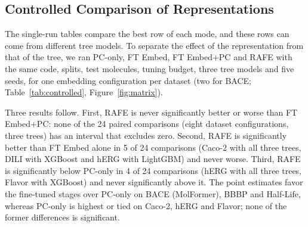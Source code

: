 \documentclass[pdflatex,sn-mathphys-num]{sn-jnl}%
\begin{document}
\begin{table}[!ht]
\centering
\caption{Best configurations on drug Half-Life (regression, TDC ADMET Group, log1p target), ranked by Spearman.}
\label{tab:half_life}
\end{table}

\subsection{Controlled Comparison of Representations}\label{sec:controlled}
The single-run tables compare the best row of each mode, and these rows can come from different tree models. To separate the effect of the representation from that of the tree, we ran PC-only, FT Embed, FT Embed+PC and RAFE with the same code, splits, test molecules, tuning budget, three tree models and five seeds, for one embedding configuration per dataset (two for BACE; Table~\ref{tab:controlled}, Figure~\ref{fig:matrix}).

Three results follow. First, RAFE is never significantly better or worse than FT Embed+PC: none of the 24 paired comparisons (eight dataset configurations, three trees) has an interval that excludes zero. Second, RAFE is significantly better than FT Embed alone in 5 of 24 comparisons (Caco-2 with all three trees, DILI with XGBoost and hERG with LightGBM) and never worse. Third, RAFE is significantly below PC-only in 4 of 24 comparisons (hERG with all three trees, Flavor with XGBoost) and never significantly above it. The point estimates favor the fine-tuned stages over PC-only on BACE (MolFormer), BBBP and Half-Life, whereas PC-only is highest or tied on Caco-2, hERG and Flavor; none of the former differences is significant.
\end{document}
